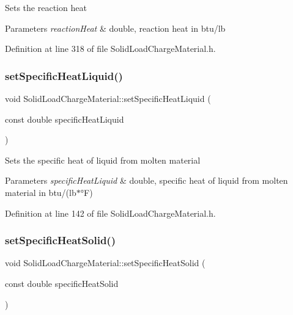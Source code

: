 Sets the reaction heat 
\begin{DoxyParams}{Parameters}
{\em reaction\+Heat} & double, reaction heat in btu/lb \\
\hline
\end{DoxyParams}


Definition at line 318 of file Solid\+Load\+Charge\+Material.\+h.

\mbox{\label{class_solid_load_charge_material_a91fad347bf52a4f6695c304904091797}} 
\subsubsection{\texorpdfstring{set\+Specific\+Heat\+Liquid()}{setSpecificHeatLiquid()}}
{\footnotesize\ttfamily void Solid\+Load\+Charge\+Material\+::set\+Specific\+Heat\+Liquid (\begin{DoxyParamCaption}\item[{const double}]{specific\+Heat\+Liquid }\end{DoxyParamCaption})\hspace{0.3cm}{\ttfamily [inline]}}

Sets the specific heat of liquid from molten material 
\begin{DoxyParams}{Parameters}
{\em specific\+Heat\+Liquid} & double, specific heat of liquid from molten material in btu/(lb$\ast$°F) \\
\hline
\end{DoxyParams}


Definition at line 142 of file Solid\+Load\+Charge\+Material.\+h.

\mbox{\label{class_solid_load_charge_material_ad9d2e3668a6a14700f4dced4882f98c0}} 
\subsubsection{\texorpdfstring{set\+Specific\+Heat\+Solid()}{setSpecificHeatSolid()}}
{\footnotesize\ttfamily void Solid\+Load\+Charge\+Material\+::set\+Specific\+Heat\+Solid (\begin{DoxyParamCaption}\item[{const double}]{specific\+Heat\+Solid }\end{DoxyParamCaption})\hspace{0.3cm}{\ttfamily [inline]}}

